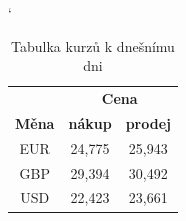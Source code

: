 \documentclass[a4paper, 11pt]{article}
\begin{document}
\begin{table}[ht]
    \catcode`
    \begin{center}
        \begin{tabular}{| c | c | c |} \hline
            & \multicolumn{2}{c|}{\textbf{Cena}} \\ \cline{2-3}
            \textbf{Měna} & \textbf{nákup}  & \textbf{prodej} \\ \hline
            EUR  & 24,775 & 25,943 \\
            GBP  & 29,394 & 30,492 \\
            USD  & 22,423 & 23,661 \\ \hline
        \end{tabular}
    \caption{Tabulka kurzů k dnešnímu dni}
    \end{center}
\end{table}
\end{document}
